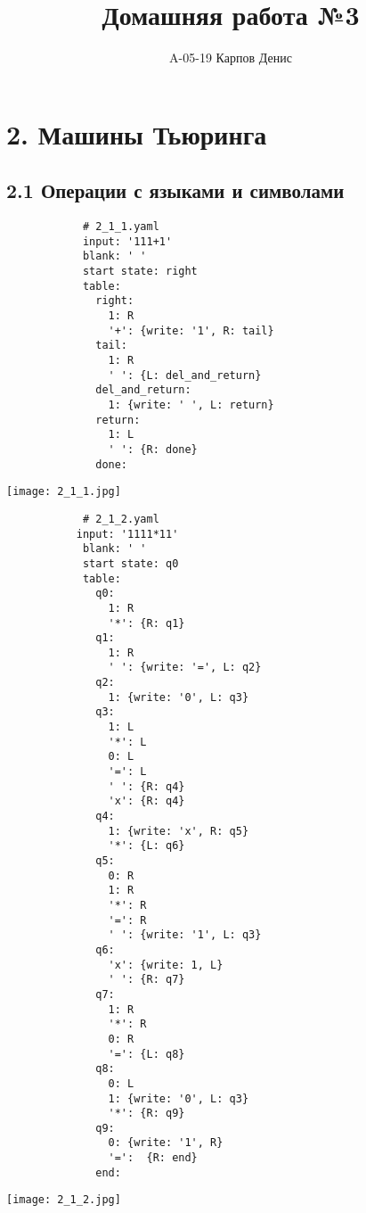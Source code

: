 \documentclass[a4paper,12pt]{article}
\title{Домашняя работа №3}
\author{A-05-19 Карпов Денис}
\date{}
\begin{document}
\maketitle

\section*{2. Машины Тьюринга}

\subsection*{2.1 Операции с языками и символами}

 \begin{verbatim}
            # 2_1_1.yaml
            input: '111+1'
            blank: ' '
            start state: right
            table:
              right:
                1: R
                '+': {write: '1', R: tail}
              tail:
                1: R
                ' ': {L: del_and_return}
              del_and_return:
                1: {write: ' ', L: return}
              return:
                1: L
                ' ': {R: done}
              done:
        \end{verbatim}
        \begin{center}
            \texttt{[image: 2\_1\_1.jpg]} \\
        \end{center}
        

 \begin{verbatim}
            # 2_1_2.yaml
           input: '1111*11'
            blank: ' '
            start state: q0
            table:
              q0:
                1: R
                '*': {R: q1}
              q1:
                1: R
                ' ': {write: '=', L: q2}
              q2:
                1: {write: '0', L: q3}
              q3:
                1: L
                '*': L
                0: L
                '=': L
                ' ': {R: q4}
                'x': {R: q4}
              q4:
                1: {write: 'x', R: q5}
                '*': {L: q6}
              q5:
                0: R 
                1: R 
                '*': R
                '=': R
                ' ': {write: '1', L: q3}
              q6:
                'x': {write: 1, L}
                ' ': {R: q7}
              q7:
                1: R
                '*': R
                0: R
                '=': {L: q8}
              q8:
                0: L
                1: {write: '0', L: q3}
                '*': {R: q9}
              q9:
                0: {write: '1', R}
                '=':  {R: end}
              end:
        \end{verbatim}
        \begin{center}
            \texttt{[image: 2\_1\_2.jpg]} \\
        \end{center}
        
\end{document}
